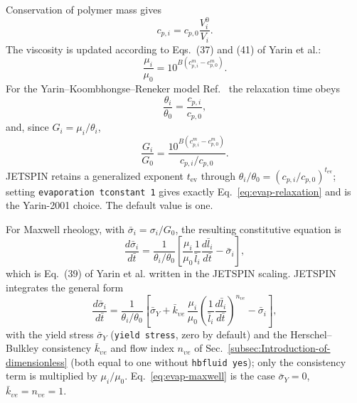 Conservation of polymer mass gives
\begin{equation}
 c_{p,i}=c_{p,0}\frac{V_i^0}{V_i}.
 \label{eq:evap-cp}
\end{equation}
The viscosity is updated according to Eqs.~(37) and (41) of Yarin et al.:
\begin{equation}
 \frac{\mu_i}{\mu_0}=
 10^{B\left(c_{p,i}^{m}-c_{p,0}^{m}\right)}.
 \label{eq:evap-viscosity}
\end{equation}
For the Yarin--Koombhongse--Reneker model Ref.~\cite{yarin2001bending} the relaxation time obeys
\begin{equation}
 \frac{\theta_i}{\theta_0}=\frac{c_{p,i}}{c_{p,0}},
 \label{eq:evap-relaxation}
\end{equation}
and, since $G_i=\mu_i/\theta_i$,
\begin{equation}
 \frac{G_i}{G_0}=
 \frac{10^{B\left(c_{p,i}^{m}-c_{p,0}^{m}\right)}}
      {c_{p,i}/c_{p,0}}.
 \label{eq:evap-elastic}
\end{equation}
JETSPIN retains a generalized exponent $t_{\mathrm{ev}}$ through
$\theta_i/\theta_0=(c_{p,i}/c_{p,0})^{t_{\mathrm{ev}}}$; setting
\texttt{evaporation tconstant 1} gives exactly
Eq.~\ref{eq:evap-relaxation} and is the Yarin-2001 choice.  The default
value is one.

For Maxwell rheology, with $\bar\sigma_i=\sigma_i/G_0$, the resulting
constitutive equation is
\begin{equation}
 \frac{d\bar\sigma_i}{d\bar t}=
 \frac{1}{\theta_i/\theta_0}
 \left[
 \frac{\mu_i}{\mu_0}\frac{1}{\bar l_i}
 \frac{d\bar l_i}{d\bar t}-\bar\sigma_i
 \right],
 \label{eq:evap-maxwell}
\end{equation}
which is Eq.~(39) of Yarin et al. written in the JETSPIN scaling.
JETSPIN integrates the general form
\begin{equation}
 \frac{d\bar\sigma_i}{d\bar t}=
 \frac{1}{\theta_i/\theta_0}
 \left[
 \bar\sigma_Y+\bar k_{\upsilon e}\,\frac{\mu_i}{\mu_0}
 \left(\frac{1}{\bar l_i}\frac{d\bar l_i}{d\bar t}\right)^{n_{\upsilon e}}
 -\bar\sigma_i
 \right],
 \label{eq:evap-maxwell-hb}
\end{equation}
with the yield stress $\bar\sigma_Y$ (\texttt{yield stress}, zero by
default) and the Herschel--Bulkley consistency $\bar k_{\upsilon e}$
and flow index $n_{\upsilon e}$ of Sec.~\ref{subsec:Introduction-of-dimensionless}
(both equal to one without \texttt{hbfluid yes}); only the consistency
term is multiplied by $\mu_i/\mu_0$.  Eq.~\ref{eq:evap-maxwell} is the
case $\bar\sigma_Y=0$, $\bar k_{\upsilon e}=n_{\upsilon e}=1$.

